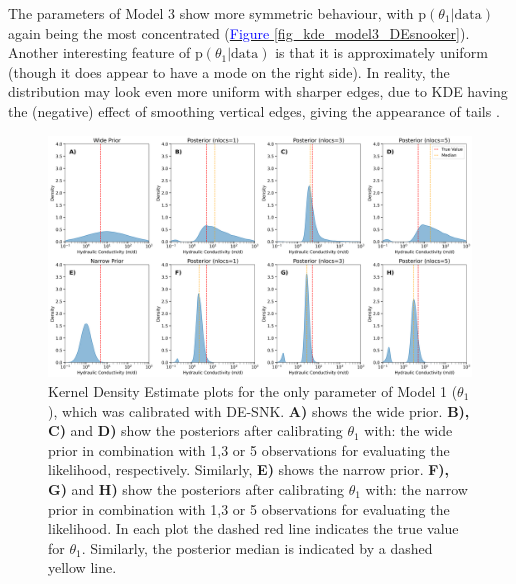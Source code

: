 \newpage
The parameters of Model 3 show more symmetric behaviour, with $\text{p}(\theta_1 | \text{data})$ again being the most concentrated (\hyperref[fig_kde_model3_DEsnooker]{\textcolor{blue}{Figure }\ref{fig_kde_model3_DEsnooker}}). Another interesting feature of $\text{p}(\theta_1 | \text{data})$ is that it is approximately uniform (though it does appear to have a mode on the right side). In reality, the distribution may look even more uniform with sharper edges, due to KDE having the (negative) effect of smoothing vertical edges, giving the appearance of tails \citep{analytica_kde}.
\begin{figure}[htb]
\centering
\includegraphics[width=1.0\textwidth]{Figures/kde_model1_DEsnooker.png}
\caption{Kernel Density Estimate plots for the only parameter of Model 1 ($\theta_1$), which was calibrated with DE-SNK. \textbf{A)} shows the wide prior. \textbf{B), C)} and \textbf{D)} show the posteriors after calibrating $\theta_1$ with: the wide prior in combination with 1,3 or 5 observations for evaluating the likelihood, respectively. Similarly, \textbf{E)} shows the narrow prior. \textbf{F), G)} and \textbf{H)} show the posteriors after calibrating $\theta_1$ with: the narrow prior in combination with 1,3 or 5 observations for evaluating the likelihood. In each plot the dashed red line indicates the true value for $\theta_1$. Similarly, the posterior median is indicated by a dashed yellow line.}\label{fig_kde_model1_DEsnooker}
\end{figure}
